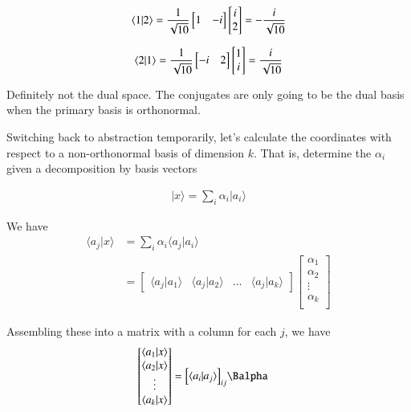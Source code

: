 \documentclass{article}
\newcommand{\ket}[1]{\lvert {#1} \rangle}
\newcommand{\braket}[2]{\langle{#1} \vert {#2}\rangle}
\begin{document}
\begin{align*}
\braket{1}{2} = 
\inv{\sqrt{10}}
\begin{bmatrix}
1 & -i
\end{bmatrix}
\begin{bmatrix}
i \\
2
\end{bmatrix}
= -\frac{i}{\sqrt{10}}
\end{align*}

\begin{align*}
\braket{2}{1} = 
\inv{\sqrt{10}}
\begin{bmatrix}
-i & 2
\end{bmatrix}
\begin{bmatrix}
1 \\
i
\end{bmatrix}
= \frac{i}{\sqrt{10}}
\end{align*}

Definitely not the dual space.  The conjugates are only going to be the dual basis when the primary basis is orthonormal.

Switching back to abstraction temporarily, let's calculate the coordinates with respect to a non-orthonormal
basis of dimension $k$.  That is, determine the $\alpha_i$ given a decomposition by basis vectors

\begin{align*}
\ket{x} = \sum_i \alpha_i \ket{a_i}
\end{align*}

We have 
\begin{align*}
\braket{a_j}{x} 
&= \sum_i \alpha_i \braket{a_j}{a_i} \\
&=
\begin{bmatrix}
\braket{a_j}{a_1} & \braket{a_j}{a_2} & \hdots & \braket{a_j}{a_k}
\end{bmatrix}
\begin{bmatrix}
\alpha_1 \\
\alpha_2 \\
\vdots \\
\alpha_k \\
\end{bmatrix}
\end{align*}

Assembling these into a matrix with a column for each $j$, we have
\begin{align*}
\begin{bmatrix}
\braket{a_1}{x} \\
\braket{a_2}{x} \\
\vdots \\
\braket{a_k}{x} \\
\end{bmatrix}
&=
{\begin{bmatrix}
\braket{a_i}{a_j}
\end{bmatrix}}_{ij}
\Balpha
\end{align*}
\end{document}

